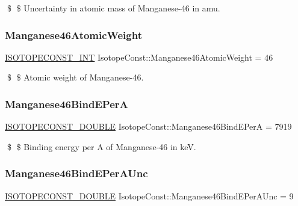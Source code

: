 \$ \$ Uncertainty in atomic mass of Manganese-\/46 in amu. \mbox{\label{group___isotope_const-_manganese-_mn46_gaa6cc31407f8a75ad7933ccee10d4ecf9}} 
\subsubsection{\texorpdfstring{Manganese46\+Atomic\+Weight}{Manganese46AtomicWeight}}
{\footnotesize\ttfamily \mbox{\hyperlink{group___isotope_const-_macros_ga5f18360b3e99483a35c32d789e62621c}{I\+S\+O\+T\+O\+P\+E\+C\+O\+N\+S\+T\+\_\+\+I\+NT}} Isotope\+Const\+::\+Manganese46\+Atomic\+Weight = 46}

\$ \$ Atomic weight of Manganese-\/46. \mbox{\label{group___isotope_const-_manganese-_mn46_gab2b65df0c1a1bd6cb08805b82bf2da43}} 
\subsubsection{\texorpdfstring{Manganese46\+Bind\+E\+PerA}{Manganese46BindEPerA}}
{\footnotesize\ttfamily \mbox{\hyperlink{group___isotope_const-_macros_ga8f45a7272ce02c0b4c65c44636ed719a}{I\+S\+O\+T\+O\+P\+E\+C\+O\+N\+S\+T\+\_\+\+D\+O\+U\+B\+LE}} Isotope\+Const\+::\+Manganese46\+Bind\+E\+PerA = 7919}

\$ \$ Binding energy per A of Manganese-\/46 in keV. \mbox{\label{group___isotope_const-_manganese-_mn46_gace2e117656956354576cc9acee07797b}} 
\subsubsection{\texorpdfstring{Manganese46\+Bind\+E\+Per\+A\+Unc}{Manganese46BindEPerAUnc}}
{\footnotesize\ttfamily \mbox{\hyperlink{group___isotope_const-_macros_ga8f45a7272ce02c0b4c65c44636ed719a}{I\+S\+O\+T\+O\+P\+E\+C\+O\+N\+S\+T\+\_\+\+D\+O\+U\+B\+LE}} Isotope\+Const\+::\+Manganese46\+Bind\+E\+Per\+A\+Unc = 9}

